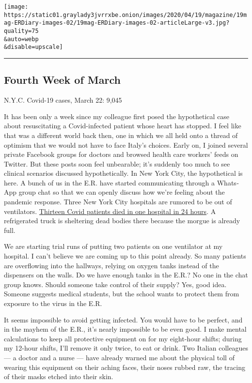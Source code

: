 \texttt{[image: https://static01.graylady3jvrrxbe.onion/images/2020/04/19/magazine/19mag-ERDiary-images-02/19mag-ERDiary-images-02-articleLarge-v3.jpg?quality=75\\\&auto=webp\\\&disable=upscale]}

\begin{center}\rule{0.5\linewidth}{\linethickness}\end{center}

\hypertarget{fourth-week-of-march}{%
\subsection{Fourth Week of March}\label{fourth-week-of-march}}

N.Y.C. Covid-19 cases, March 22: 9,045

It has been only a week since my colleague first posed the hypothetical
case about resuscitating a Covid-infected patient whose heart has
stopped. I feel like that was a different world back then, one in which
we all held onto a thread of optimism that we would not have to face
Italy's choices. Early on, I joined several private Facebook groups for
doctors and browsed health care workers' feeds on Twitter. But these
posts soon feel unbearable; it's suddenly too much to see clinical
scenarios discussed hypothetically. In New York City, the hypothetical
is here. A bunch of us in the E.R. have started communicating through a
Whats­App group chat so that we can openly discuss how we're feeling
about the pandemic response. Three New York City hospitals are rumored
to be out of ventilators.
\href{https://www.nytimes3xbfgragh.onion/2020/03/25/nyregion/nyc-coronavirus-hospitals.html}{Thirteen
Covid patients died in one hospital in 24 hours}. A refrigerated truck
is sheltering dead bodies there because the morgue is already full.

We are starting trial runs of putting two patients on one ventilator at
my hospital. I can't believe we are coming up to this point already. So
many patients are overflowing into the hallways, relying on oxygen tanks
instead of the dispensers on the walls. Do we have enough tanks in the
E.R.? No one in the chat group knows. Should someone take control of
their supply? Yes, good idea. Someone suggests medical students, but the
school wants to protect them from exposure to the virus in the E.R.

It seems impossible to avoid getting infected. You would have to be
perfect, and in the mayhem of the E.R., it's nearly impossible to be
even good. I make mental calculations to keep all protective equipment
on for my eight-hour shifts; during my 12-hour shifts, I'll remove it
only twice, to eat or drink. Two Italian colleagues --- a doctor and a
nurse --- have already warned me about the physical toll of wearing this
equipment on their aching faces, their noses rubbed raw, the tracing of
their masks etched into their skin.

